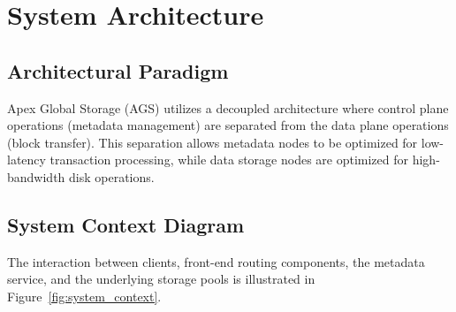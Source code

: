 \section{System Architecture}

\subsection{Architectural Paradigm}
Apex Global Storage (AGS) utilizes a decoupled architecture where control plane operations (metadata management) are separated from the data plane operations (block transfer). This separation allows metadata nodes to be optimized for low-latency transaction processing, while data storage nodes are optimized for high-bandwidth disk operations.

\subsection{System Context Diagram}
The interaction between clients, front-end routing components, the metadata service, and the underlying storage pools is illustrated in Figure~\ref{fig:system_context}.

